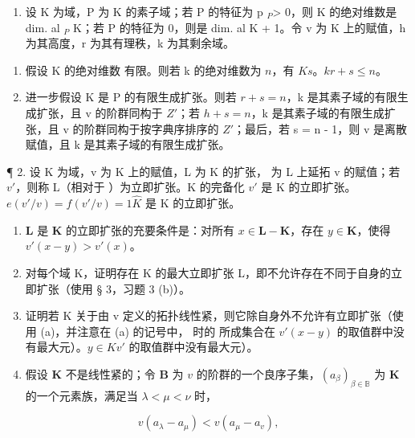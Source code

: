 
\begin{enumerate}
\def\labelenumi{\arabic{enumi}.}
\tightlist
\item
  设 K 为域，P 为 K 的素子域；若 P 的特征为 p \(_{P}\)\textgreater{} 0，则 K 的绝对维数是 dim. al \(_{P}\) K；若 P 的特征为 0，则是 dim. al  K + 1。令 v 为 K 上的赋值，h 为其高度，r 为其有理秩，k 为其剩余域。
\end{enumerate}

\begin{enumerate}
\def\labelenumi{(\alph{enumi})}
\item
  假设 K 的绝对维数  有限。则若 k 的绝对维数为 \(n\)，有 \(K\)\(s\)。\(k\)\(r + s \leqslant n\)。
\item
  进一步假设 K 是 P 的有限生成扩张。则若 \(r + s = n\)，k 是其素子域的有限生成扩张，且 v 的阶群同构于 \(Z'\)；若 \(h + s = n\)，k 是其素子域的有限生成扩张，且 v 的阶群同构于按字典序排序的 \(Z'\)；最后，若 s = n - 1，则 v 是离散赋值，且 k 是其素子域的有限生成扩张。
\end{enumerate}

¶ 2. 设 K 为域，v 为 K 上的赋值，L 为 K 的扩张， 为 L 上延拓 v 的赋值；若 \(v'\)，则称 L（相对于 ）为立即扩张。K 的完备化 \(v'\) 是 K 的立即扩张。\(e(v'/v) = f(v'/v) = 1\)\(\hat{K}\) 是 K 的立即扩张。

\begin{enumerate}
\def\labelenumi{(\alph{enumi})}
\item
  \(\mathbf{L}\) 是 \(\mathbf{K}\) 的立即扩张的充要条件是：对所有 \(x \in \mathbf{L} - \mathbf{K}\)，存在 \(y \in \mathbf{K}\)，使得 \(v'(x - y) > v'(x)\)。
\item
  对每个域 K，证明存在 K 的最大立即扩张 L，即不允许存在不同于自身的立即扩张（使用 § 3，习题 3 (b)）。
\item
  证明若 K 关于由 v 定义的拓扑线性紧，则它除自身外不允许有立即扩张（使用 (a)，并注意在 (a) 的记号中， 时的  所成集合在 \(v'(x - y)\) 的取值群中没有最大元）。\(y \in K\)\(v'\) 的取值群中没有最大元）。
\item
  假设 \(\mathbf{K}\) 不是线性紧的；令 \(\mathbf{B}\) 为 \(v\) 的阶群的一个良序子集，\((a_{\beta})_{\beta \in \mathbb{B}}\) 为 \(\mathbf{K}\) 的一个元素族，满足当 \(\lambda < \mu < \nu\) 时，
\end{enumerate}

\[
v (a _ {\lambda} - a _ {\mu}) <   v (a _ {\mu} - a _ {v}),
\]

